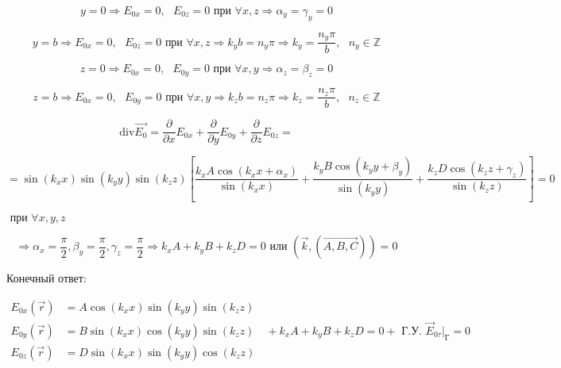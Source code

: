\documentclass[12pt, a4paper]{report}
\begin{document}
    \[ y = 0 \Rightarrow E_{0x } = 0, \text{ }  E_{0z } = 0 \text{ при } \forall x,z \Rightarrow \alpha_y = \gamma _y = 0  \] 

    \[ y = b \Rightarrow E_{0x } = 0, \text{ }  E_{0z } = 0 \text{ при } \forall x,z \Rightarrow k_y b = n_y \pi \Rightarrow k_y = \frac{ n_y \pi } {b } , \text{ }  n_y \in  \mathbb{Z}    \] 

    \[ z= 0 \Rightarrow E_{0x } = 0, \text{ }  E_{0y } = 0 \text{ при } \forall x,y \Rightarrow \alpha_z = \beta _z = 0  \] 

    \[ z= b \Rightarrow E_{0x } = 0, \text{ }  E_{0y } = 0 \text{ при } \forall x,y \Rightarrow k_z b = n_z \pi \Rightarrow k_z = \frac{ n_z \pi } {b } , \text{ }  n_z \in  \mathbb{Z}    \] 

    \[ \mathrm{div } \vec{E_0} = \frac{\partial  }{\partial  x } E_{0x} + \frac{\partial  }{\partial  y } E_{0y } + \frac{\partial  }{\partial  z }E _{0z } =       \] 

    \[ =\sin (k_x x) \sin (k_y y )\sin (k_z z) \left[ \frac{k_xA \cos (k_x x + \alpha_x) }{\sin (k_x x)} + \frac{k_yB \cos (k_y y + \beta_y) }{\sin (k_y y)} + \frac{k_z D  \cos (k_z  z+ \gamma_z) }{\sin (k_z  z)}  \right]  = 0       \] 

    \( \text{ при } \forall  x, y , z \) 

    \[ \Rightarrow \alpha_x = \frac{\pi}{2 }  , \beta_y = \frac{\pi}{2 } , \gamma_z = \frac{\pi}{2 } \Rightarrow k_x A + k_y B + k_z D = 0 \text{  или }   (\vec{k } , (\overrightarrow{A,B,C}) ) = 0  \] 

    Конечный ответ: 

    \[ \begin{aligned}
        E_{0x }  (\vec{r } ) &= A \cos (k_x x )\sin (k_y y )\sin (k_z z) \\
        E_{0y}(\vec{r} ) &= B \sin (k_x x )\cos (k_y y )\sin (k_z z)  \quad  + k_x A + k_y B + k_z D = 0 + \text{ Г.У. } \vec{E} _{0 \tau } |_{\text{Г} } = 0      \\
        E_{0z}(\vec{r} ) &= D \sin (k_x x )\sin (k_y y )\cos (k_z z) 
    \end{aligned} \] 



\ifdefined\mainfile
\else
    
\end{document}
